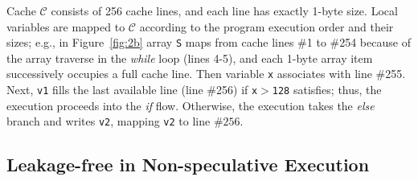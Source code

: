 \documentclass[sigconf,screen]{acmart}
\begin{document}
Cache $\mathcal{C}$ consists of 256 cache lines, and each line has exactly 
1-byte size. Local variables are mapped to $\mathcal{C}$ according to the 
program execution order and their sizes; e.g., in Figure~\ref{fig:2b} array 
\texttt{S} maps from cache lines \#1 to \#254 because of the array traverse 
in the \emph{while} loop (lines 4-5), and each 1-byte array item successively 
occupies a full cache line. Then variable \texttt{x} associates with line 
\#255. Next, \texttt{v1} fills the last available line (line \#256) if 
\texttt{x}$>$\texttt{128} satisfies; thus, the execution proceeds into the 
\textit{if} flow. Otherwise, the execution takes the \textit{else} branch 
and writes \texttt{v2}, mapping \texttt{v2} to line $\#256$.






\subsection{Leakage-free in Non-speculative Execution}
\label{sec:no_leak}
\end{document}
